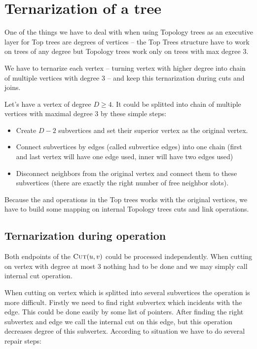 \section{Ternarization of a tree}

One of the things we have to deal with when using Topology trees as an executive
layer for Top trees are degrees of vertices -- the Top Trees structure have to
work on trees of any degree but Topology trees work only on trees with max
degree 3.

We have to {\I ternarize} each vertex -- turning vertex with higher degree into
chain of multiple vertices with degree 3 -- and keep this ternarization during
cuts and joins.

Let's have a vertex of degree $D\ge4$. It could be splitted into chain of
multiple vertices with maximal degree 3 by these simple steps:
\begin{itemize}
\item Create $D - 2$ {\I subvertices} and set their {\I superior vertex} as the
original vertex.
\item Connect subvertices by edges (called {\I subvertice edges}) into one chain (first
and last vertex will have one edge used, inner will have two edges used)
\item Disconnect neighbors from the original vertex and connect them to these
subvertices (there are exactly the right number of free neighbor slots).
\end{itemize}

Because the \Cut{} and \Link{} operations in the Top trees works with the original
vertices, we have to build some mapping on internal Topology trees cuts and link
operations.

\subsection{Ternarization during \Cut{} operation}

Both endpoints of the $\hbox{\sc Cut}(u,v)$ could be processed independently. When cutting on
vertex with degree at most 3 nothing had to be done and we may simply call
internal cut operation.

When cutting on vertex which is splitted into several subvertices the operation
is more difficult. Firstly we need to find right subvertex which incidents with
the edge. This could be done easily by some list of pointers. After finding the
right subvertex and edge we call the internal cut on this edge, but this
operation decreases degree of this subvertex. According to situation we have to
do several repair steps:


